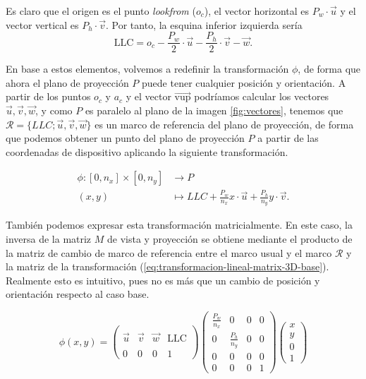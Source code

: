 Es claro que el origen es el punto \textit{lookfrom} ($o_c$), el vector horizontal es $P_w\cdot \vec u$ y el vector vertical es $P_h\cdot \vec v$. Por tanto, la esquina inferior izquierda sería
$$
\mathrm{LLC} = o_c - \frac{P_w}{2}\cdot \vec u - \frac{P_h}{2}\cdot \vec v - \vec w.
$$

En base a estos elementos, volvemos a redefinir la transformación $\phi$, de forma que ahora el plano de proyección $P$ puede tener cualquier posición y orientación. A partir de los puntos $o_c$ y $a_c$ y el vector $\overrightarrow{\mathrm{vup}}$ podríamos calcular los vectores $\vec u, \vec v, \vec w$, y como $P$ es paralelo al plano de la imagen \ref{fig:vectores}, tenemos que $\mathcal{R}=\{LLC; \vec u, \vec v, \vec w \}$ es un marco de referencia del plano de proyección, de forma que podemos obtener un punto del plano de proyección $P$ a partir de las coordenadas de dispositivo aplicando la siguiente transformación.

\begin{equation}
    \label{eq:transformacion-lineal-6}
    \begin{split}
        \phi : [0,n_x]\times [0,n_y] & \longrightarrow P \\
        (x,y) & \longmapsto LLC + \frac{P_w}{n_x}x\cdot \vec u + \frac{P_h}{n_y}y\cdot\vec v.
    \end{split}
\end{equation}

También podemos expresar esta transformación matricialmente. En este caso, la inversa de la matriz $M$ de vista y proyección se obtiene mediante el producto de la matriz de cambio de marco de referencia entre el marco usual y el marco $\mathcal{R}$ y la matriz de la transformación (\ref{eq:transformacion-lineal-matrix-3D-base}). Realmente esto es intuitivo, pues no es más que un cambio de posición y orientación respecto al caso base.

\begin{equation}
    \label{eq:transformacion-lineal-matrix-3D-camara}
    \phi(x,y) = \left(\begin{array}{ccc|c}
        &  &  &  \\
        \vec u & \vec v & \vec w & \mathrm{LLC} \\
        &  &  &  \\ \hline
        0 & 0 & 0 & 1
    \end{array}\right)\left(\begin{array}{ccc|c}
        \frac{P_w}{n_x} & 0 & 0 & 0 \\
        0 & \frac{P_h}{n_y} & 0 & 0 \\
        0 & 0 & 0 & 0 \\ \hline
        0 & 0 & 0 & 1
    \end{array}\right)\left(
        \begin{array}{c}
            x \\ y \\ 0 \\ \hline 1
        \end{array}\right)
\end{equation}

